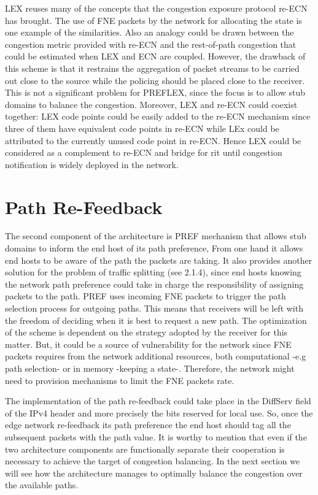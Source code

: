 LEX reuses many of the concepts that the congestion exposure protocol re-ECN has brought. The use of FNE packets by the network for allocating the state is one example of the similarities. Also an analogy could be drawn between the congestion metric provided with re-ECN and the rest-of-path congestion that could be estimated when LEX and ECN are coupled. However, the drawback of this scheme is that it restrains the aggregation of  packet streams to be carried out close to the source while the policing should be placed close to the receiver. This is not a significant problem for PREFLEX, since the focus  is to allow stub domains to balance the congestion. Moreover, LEX and re-ECN could coexist together: LEX code points could be easily added to the re-ECN mechanism since three of them have equivalent code points in re-ECN while LEx could be attributed to the currently unused code point in re-ECN. Hence LEX could be considered as a complement to re-ECN and bridge for rit until congestion notification is widely deployed in the network.

\section{Path Re-Feedback}

The second component of the architecture is PREF mechanism that allows stub domains to inform the end host of its path preference, From one hand it allows end hosts to be aware of the path the packets are taking. It also provides another solution for the problem of traffic splitting (see 2.1.4), since end hosts knowing the network path preference could take in charge the responsibility of assigning packets to the path. PREF uses incoming FNE packets to trigger the path selection process for outgoing paths. This means that receivers will be left with the freedom of deciding when it is best to request a new path. The optimization of the scheme is dependent on the strategy adopted by the receiver for this matter. But, it could be a source of vulnerability for the network since FNE packets requires from the network  additional resources, both computational -e.g path selection- or in memory -keeping a state-. Therefore, the network might need to provision mechanisms to limit the FNE packets rate.

The implementation of the path re-feedback could take place in the DiffServ field of the IPv4 header and more precisely the bits reserved for local use. So, once the edge network re-feedback its path preference the end host should tag all the subsequent packets with the path value.
It is worthy to mention that even if the two architecture components are functionally separate their cooperation is necessary to achieve the target of congestion balancing. In the next section we will see how the architecture manages to optimally balance the congestion over the available paths.

